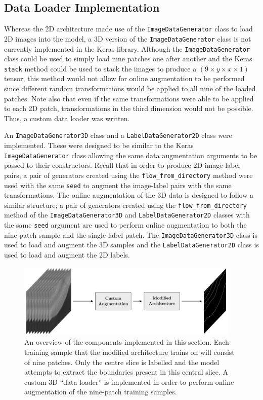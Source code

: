 \subsection{Data Loader Implementation}

Whereas the 2D architecture made use of the \texttt{ImageDataGenerator} class to load 2D images into the model, a 3D version of the \texttt{ImageDataGenerator} class is not currently implemented in the Keras library. Although the \texttt{ImageDataGenerator} class could be used to simply load nine patches one after another and the Keras \texttt{stack} method could be used to stack the images to produce a $(9 \times y \times x \times 1)$ tensor, this method would not allow for online augmentation to be performed since different random transformations would be applied to all nine of the loaded patches. Note also that even if the same transformations were able to be applied to each 2D patch, transformations in the third dimension would not be possible. Thus, a custom data loader was written.

An \texttt{ImageDataGenerator3D} class and a \texttt{LabelDataGenerator2D} class were implemented. These were designed to be similar to the Keras \texttt{ImageDataGenerator} class allowing the same data augmentation arguments to be passed to their constructors. Recall that in order to produce 2D image-label pairs, a pair of generators created using the \texttt{flow\_from\_directory} method were used with the same \texttt{seed} to augment the image-label pairs with the same transformations. The online augmentation of the 3D data is designed to follow a similar structure; a pair of generators created using the \texttt{flow\_from\_directory} method of the \texttt{ImageDataGenerator3D} and \texttt{LabelDataGenerator2D} classes with the same \texttt{seed} argument are used to perform online augmentation to both the nine-patch sample and the single label patch. The \texttt{ImageDataGenerator3D} class is used to load and augment the 3D samples and the \texttt{LabelDataGenerator2D} class is used to load and augment the 2D labels.

\begin{figure}[t]
    \centering
    \includegraphics[width=0.95\textwidth]{images/3D-overview.pdf}
    \caption{An overview of the components implemented in this section. Each training sample that the modified architecture trains on will consist of nine patches. Only the centre slice is labelled and the model attempts to extract the boundaries present in this central slice. A custom 3D ``data loader'' is implemented in order to perform online augmentation of the nine-patch training samples.}
    \label{fig:3doverview}
\end{figure}

